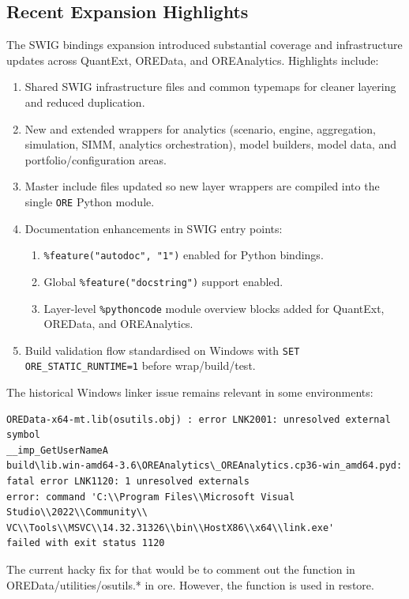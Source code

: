 \documentclass[10pt]{article}
\begin{document}
\subsection*{Recent Expansion Highlights}
The SWIG bindings expansion introduced substantial coverage and infrastructure updates across QuantExt, OREData, and OREAnalytics. Highlights include:
\begin{enumerate}
    \item Shared SWIG infrastructure files and common typemaps for cleaner layering and reduced duplication.
    \item New and extended wrappers for analytics (scenario, engine, aggregation, simulation, SIMM, analytics orchestration), model builders, model data, and portfolio/configuration areas.
    \item Master include files updated so new layer wrappers are compiled into the single \texttt{ORE} Python module.
    \item Documentation enhancements in SWIG entry points:
    \begin{enumerate}
        \item \texttt{\%feature("autodoc", "1")} enabled for Python bindings.
        \item Global \texttt{\%feature("docstring")} support enabled.
        \item Layer-level \texttt{\%pythoncode} module overview blocks added for QuantExt, OREData, and OREAnalytics.
    \end{enumerate}
    \item Build validation flow standardised on Windows with \texttt{SET ORE\_STATIC\_RUNTIME=1} before wrap/build/test.
\end{enumerate}

The historical Windows linker issue remains relevant in some environments:
\begin{lstlisting}[basicstyle=\small]
OREData-x64-mt.lib(osutils.obj) : error LNK2001: unresolved external symbol
__imp_GetUserNameA
build\lib.win-amd64-3.6\OREAnalytics\_OREAnalytics.cp36-win_amd64.pyd:
fatal error LNK1120: 1 unresolved externals
error: command 'C:\\Program Files\\Microsoft Visual Studio\\2022\\Community\\
VC\\Tools\\MSVC\\14.32.31326\\bin\\HostX86\\x64\\link.exe'
failed with exit status 1120
\end{lstlisting}
The current hacky fix for that would be to comment out the function in OREData/utilities/osutils.* in ore. However, the function is used in restore.
\end{document}
